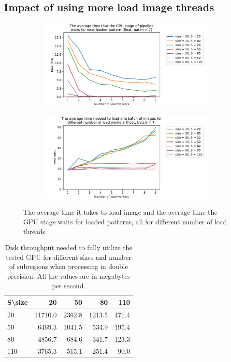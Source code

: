\subsection{Impact of using more load image threads}

\begin{figure}
	\centering
	\begin{subfigure}{\textwidth}
		\centering
		\includegraphics[width=0.75\linewidth]{img/eval/loadworkers-offset-wait}
		\caption{}
		\label{loadworkers-offset-wait}
	\end{subfigure}
	
	\begin{subfigure}{\textwidth}
		\centering
		\includegraphics[width=0.75\linewidth]{img/eval/loadworkers-load-tiff}
		\caption{}
		\label{loadworkers-load-tiff}
	\end{subfigure}


	\caption{The average time it takes to load image and the average time the GPU stage waits for loaded patterns, all for different number of load threads.}
	\label{loadworkers}
\end{figure}

\begin{table}[]
	\centering
	\begin{tabular}{@{}l|rrrr@{}}
		S\textbackslash size &      20 &     50 &     80 &   110 \\ \midrule
		20                   & 11710.0 & 2362.8 & 1213.5 & 471.4 \\
		50                   &  6469.3 & 1041.5 &  534.9 & 195.4 \\
		80                   &  4856.7 &  684.6 &  341.7 & 123.3 \\
		110                  &  3765.3 &  515.1 &  251.4 &  90.0
	\end{tabular}
	\caption{Disk throughput needed to fully utilize the tested GPU for different sizes and number of subregions when processing in double precision. All the values are in megabytes per second.}
	\label{loadworkers-table}
\end{table}

